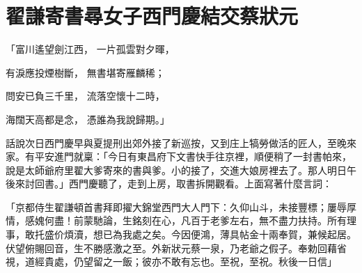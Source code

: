 %

\chapter{翟謙寄書尋女子\KG 西門慶結交蔡狀元}


\begin{showcontents}{}





「富川遙望劍江西，  一片孤雲對夕暉，

有淚應投煙樹斷，  無書堪寄雁麟稀；

問安已負三千里，  流落空懷十二時，

海闊天高都是念，  憑誰為我說歸期。」

話說次日西門慶早與夏提刑出郊外接了新巡按，又到庄上犒勞做活的匠人，至晚來家。有平安進門就稟：「今日有東昌府下文書快手往京裡，順便稍了一封書帕來，說是太師爺府里翟大爹寄來的書與爹。小的接了，交進大娘房裡去了。那人明日午後來討回書。」西門慶聽了，走到上房，取書拆開觀看。上面寫著什麼言詞：

「京都侍生翟謙頓首書拜即擢大錦堂西門大人門下：久仰山斗，未接豐標；屢辱厚情，感媿何盡！前蒙馳論，生銘刻在心，凡百于老爹左右，無不盡力扶持。所有理事，敢托盛价煩瀆，想已為我處之矣。今因便鴻，薄具帖金十兩奉賀，兼候起居。伏望俯賜回音，生不勝感激之至。外新狀元蔡一泉，乃老爺之假子。奉勅回藉省視，道經貴處，仍望留之一飯；彼亦不敢有忘也。至祝，至祝。秋後一日信」


\end{showcontents}
